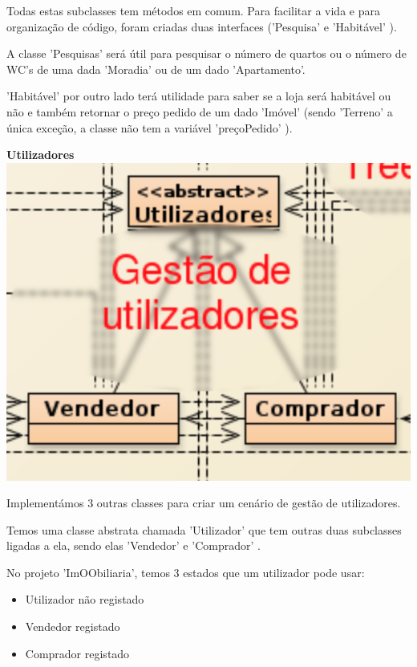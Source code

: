 \documentclass[12pt]{article}
\begin{document}
Todas estas subclasses tem métodos em comum. Para facilitar a vida e para organização de código, foram criadas duas interfaces ('Pesquisa' e 'Habitável' ).
\newline
\newline

A classe 'Pesquisas'  será útil para pesquisar o número de quartos ou o número de WC's de uma dada 'Moradia' ou de um dado 'Apartamento'.
\newline

'Habitável' por outro lado terá utilidade para saber se a loja será habitável ou não e também retornar o preço pedido de um dado 'Imóvel' (sendo 'Terreno' a única exceção, a classe não tem a variável 'preçoPedido' ).    

\pagebreak

\textbf{Utilizadores}
\newline
\newline
\includegraphics[scale=0.2]{006.png}	


Implementámos 3 outras classes para criar um cenário de gestão de utilizadores. 
\newline

Temos uma classe abstrata chamada 'Utilizador' que tem outras duas subclasses ligadas a ela, sendo elas 'Vendedor' e 'Comprador' .
\newline

No projeto 'ImOObiliaria', temos 3 estados que um utilizador pode usar:
\newline
\begin{itemize}
\item Utilizador não registado
\item Vendedor registado
\item Comprador registado
\end{itemize}
\end{document}
